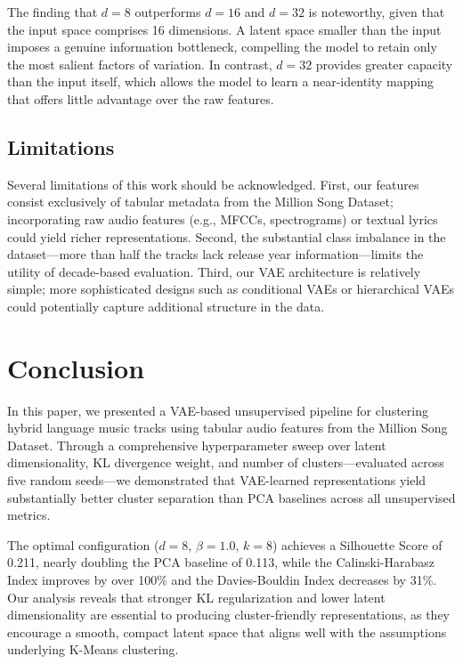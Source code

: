 \documentclass[11pt]{article}
\begin{document}
The finding that $d = 8$ outperforms $d = 16$ and $d = 32$ is noteworthy, given that the input space comprises 16 dimensions. A latent space smaller than the input imposes a genuine information bottleneck, compelling the model to retain only the most salient factors of variation. In contrast, $d = 32$ provides greater capacity than the input itself, which allows the model to learn a near-identity mapping that offers little advantage over the raw features.

\subsection{Limitations}

Several limitations of this work should be acknowledged. First, our features consist exclusively of tabular metadata from the Million Song Dataset; incorporating raw audio features (e.g., MFCCs, spectrograms) or textual lyrics could yield richer representations. Second, the substantial class imbalance in the dataset---more than half the tracks lack release year information---limits the utility of decade-based evaluation. Third, our VAE architecture is relatively simple; more sophisticated designs such as conditional VAEs or hierarchical VAEs could potentially capture additional structure in the data.

\section{Conclusion}

In this paper, we presented a VAE-based unsupervised pipeline for clustering hybrid language music tracks using tabular audio features from the Million Song Dataset. Through a comprehensive hyperparameter sweep over latent dimensionality, KL divergence weight, and number of clusters---evaluated across five random seeds---we demonstrated that VAE-learned representations yield substantially better cluster separation than PCA baselines across all unsupervised metrics.

The optimal configuration ($d = 8$, $\beta = 1.0$, $k = 8$) achieves a Silhouette Score of 0.211, nearly doubling the PCA baseline of 0.113, while the Calinski-Harabasz Index improves by over 100\% and the Davies-Bouldin Index decreases by 31\%. Our analysis reveals that stronger KL regularization and lower latent dimensionality are essential to producing cluster-friendly representations, as they encourage a smooth, compact latent space that aligns well with the assumptions underlying K-Means clustering.
\end{document}
